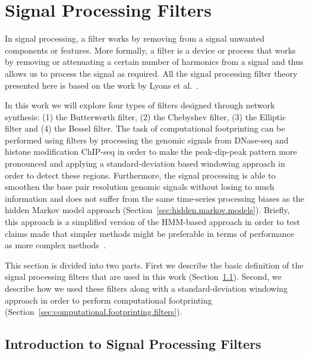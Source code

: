 \section{Signal Processing Filters}
\label{sec:signal.processing.filters}

In signal processing, a filter works by removing from a signal unwanted components or features. More formally, a filter is a device or process that works by removing or attenuating a certain number of harmonics from a signal and thus allows us to process the signal as required. All the signal processing filter theory presented here is based on the work by Lyons et al.~\cite{lyons2010}.

In this work we will explore four types of filters designed through network synthesis: (1) the Butterworth filter, (2) the Chebyshev filter, (3) the Elliptic filter and (4) the Bessel filter. The task of computational footprinting can be performed using filters by processing the genomic signals from DNase-seq and histone modification ChIP-seq in order to make the peak-dip-peak pattern more pronounced and applying a standard-deviation based windowing approach in order to detect these regions. Furthermore, the signal processing is able to smoothen the base pair resolution genomic signals without losing to much information and does not suffer from the same time-series processing biases as the hidden Markov model approach (Section~\ref{sec:hidden.markov.models}). Briefly, this approach is a simplified version of the HMM-based approach in order to test claims made that simpler methods might be preferable in terms of performance as more complex methods~\cite{cuellar2012,he2014}.

This section is divided into two parts. First we describe the basic definition of the signal processing filters that are used in this work (Section~\ref{sec:intro.signal.processing.filters}). Second, we describe how we used these filters along with a standard-deviation windowing approach in order to perform computational footprinting (Section~\ref{sec:computational.footprinting.filters}).

\subsection{Introduction to Signal Processing Filters}
\label{sec:intro.signal.processing.filters}

